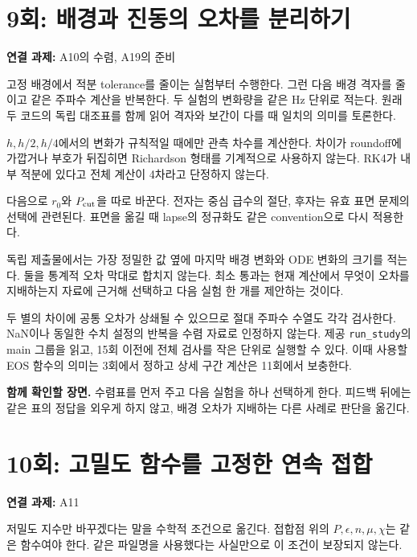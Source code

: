 \documentclass[
  10pt,
  a4paper,
]{article}
\begin{document}
\section{9회: 배경과 진동의 오차를
분리하기}\label{uxd68c-uxbc30uxacbduxacfc-uxc9c4uxb3d9uxc758-uxc624uxcc28uxb97c-uxbd84uxb9acuxd558uxae30}

\textbf{연결 과제:} A10의 수렴, A19의 준비

고정 배경에서 적분 tolerance를 줄이는 실험부터 수행한다. 그런 다음 배경
격자를 줄이고 같은 주파수 계산을 반복한다. 두 실험의 변화량을 같은 Hz
단위로 적는다. 원래 두 코드의 독립 대조표를 함께 읽어 격자와 보간이 다를
때 일치의 의미를 토론한다.

\(h,h/2,h/4\)에서의 변화가 규칙적일 때에만 관측 차수를 계산한다. 차이가
roundoff에 가깝거나 부호가 뒤집히면 Richardson 형태를 기계적으로
사용하지 않는다. RK4가 내부 적분에 있다고 전체 계산이 4차라고 단정하지
않는다.

다음으로 \(r_0\)와 \(P_{\rm cut}\)을 따로 바꾼다. 전자는 중심 급수의
절단, 후자는 유효 표면 문제의 선택에 관련된다. 표면을 옮길 때 lapse의
정규화도 같은 convention으로 다시 적용한다.

독립 제출물에서는 가장 정밀한 값 옆에 마지막 배경 변화와 ODE 변화의
크기를 적는다. 둘을 통계적 오차 막대로 합치지 않는다. 최소 통과는 현재
계산에서 무엇이 오차를 지배하는지 자료에 근거해 선택하고 다음 실험 한
개를 제안하는 것이다.

두 별의 차이에 공통 오차가 상쇄될 수 있으므로 절대 주파수 수열도 각각
검사한다. NaN이나 동일한 수치 설정의 반복을 수렴 자료로 인정하지 않는다.
제공 \texttt{run\_study}의 main 그룹을 읽고, 15회 이전에 전체 검사를
작은 단위로 실행할 수 있다. 이때 사용할 EOS 함수의 의미는 3회에서 정하고
상세 구간 계산은 11회에서 보충한다.

\textbf{함께 확인할 장면.} 수렴표를 먼저 주고 다음 실험을 하나 선택하게
한다. 피드백 뒤에는 같은 표의 정답을 외우게 하지 않고, 배경 오차가
지배하는 다른 사례로 판단을 옮긴다.

\section{10회: 고밀도 함수를 고정한 연속
접합}\label{uxd68c-uxace0uxbc00uxb3c4-uxd568uxc218uxb97c-uxace0uxc815uxd55c-uxc5f0uxc18d-uxc811uxd569}

\textbf{연결 과제:} A11

저밀도 지수만 바꾸겠다는 말을 수학적 조건으로 옮긴다. 접합점 위의
\(P,\epsilon,n,\mu,\chi\)는 같은 함수여야 한다. 같은 파일명을 사용했다는
사실만으로 이 조건이 보장되지 않는다.
\end{document}
